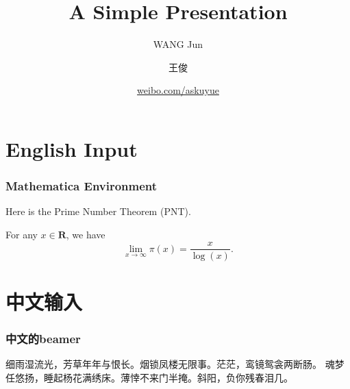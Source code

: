 \documentclass[compress]{beamer}
\title{A Simple Presentation}
\author{WANG Jun \and 王俊}
\institute[HIT]{ %
	Department of Mathematica \\[1ex]
	Harbin Institute of Technology\\[2ex]
	\textcolor{green}{\texttt{\emph{askuyue@gmail.com}}}
	}
\date{ %
	\url{weibo.com/askuyue}
	}
\numberwithin{equation}{section} %
\begin{document}
\begin{frame}
  \titlepage
\end{frame}
\begin{frame}\transsplitverticalin
		\tableofcontents
\end{frame}
\section{English Input}
\begin{frame}
	\frametitle{Mathematica Environment}
	Here is the Prime Number Theorem (PNT).
  \begin{theorem}[PNT]
  	For any $x \in \mathbf{R}$, we have
  	\begin{equation}
	  		\lim_{x\rightarrow \infty}\pi\left( x \right) = \frac{x}{\log\left(x\right)}.
  	\end{equation}
  \end{theorem}
\end{frame}

\section{中文输入}
\begin{frame}
	\frametitle{中文的beamer}
			细雨湿流光，芳草年年与恨长。烟锁凤楼无限事。茫茫，鸾镜鸳衾两断肠。
			魂梦任悠扬，睡起杨花满绣床。薄悻不来门半掩。斜阳，负你残春泪几。
\end{frame}
\end{document}
